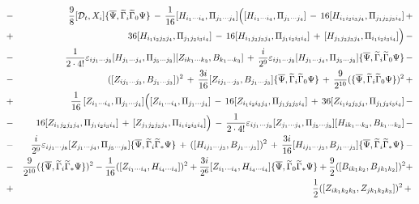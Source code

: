 \documentclass[a4paper,11pt]{article}
\begin{document}
\begin{eqnarray*}
&-&\frac{9}{8}[{\cal D}_{t},X_{i}]\{\overline{\Psi },\widetilde{\Gamma }_{i}\widetilde{\Gamma }_{0}\Psi\}\,-\,
\frac{1}{16}[H_{i_1 \cdots i_4},\Pi_{j_1 \cdots j_4}]\Big([H_{i_1 \cdots i_4},\Pi_{j_1 \cdots j_4}]\,-\,
16[H_{i_1 i_2 i_3 j_4},\Pi_{j_1 j_2 j_3 i_4}]\,+\nonumber \\
&+&\,36[H_{i_1 i_2 j_3 j_4},\Pi_{j_1 j_2 i_3 i_4}]\,-\,
16[H_{i_1 j_2 j_3 j_4},\Pi_{j_1 i_2 i_3 i_4}]\,+\,[H_{j_1 j_2 j_3 j_4},\Pi_{i_1 i_2 i_3 i_4}]\Big)\,-\nonumber\\
&-&\frac{1}{2\cdot 4!}\varepsilon_{ij_1 \cdots j_8}[H_{j_1 \cdots j_4},\Pi_{j_5 \cdots j_8}][Z_{i k_1 \cdots k_3},B_{k_1 \cdots k_3}]\,+\,
\frac{i}{2^9}\varepsilon_{ij_1 \cdots j_8}[H_{j_1 \cdots j_4},\Pi_{j_5 \cdots j_8}]\{\overline{\Psi },\widetilde{\Gamma }_{i}\widetilde{\Gamma }_{0}\Psi\}\,-\nonumber\\
&-&([Z_{i j_1 \cdots j_3},B_{j_1 \cdots j_3}])^2\,+\,
\frac{3i}{16}[Z_{i j_1 \cdots j_3},B_{j_1 \cdots j_3}]\{\overline{\Psi },\widetilde{\Gamma }_{i}\widetilde{\Gamma }_{0}\Psi\}\,+\,\frac{9}{2^{10}}(\{\overline{\Psi },\widetilde{\Gamma }_{i}\widetilde{\Gamma }_{0}\Psi\})^2\,+\nonumber\\
&+&\frac{1}{16}\,[Z_{i_1 \cdots i_4},\Pi_{j_1 \cdots j_4}]\Big([Z_{i_1 \cdots i_4},\Pi_{j_1 \cdots j_4}]\,-\,
16[Z_{i_1 i_2 i_3 j_4},\Pi_{j_1 j_2 j_3 i_4}]\,+\,36[Z_{i_1 i_2 j_3 j_4},\Pi_{j_1 j_2 i_3 i_4}]\,-\nonumber\\
&-&\,16[Z_{i_1 j_2 j_3 j_4},\Pi_{j_1 i_2 i_3 i_4}]\,+\,[Z_{j_1 j_2 j_3 j_4},\Pi_{i_1 i_2 i_3 i_4}]\Big)\,-\,
\frac{1}{2\cdot 4!}\varepsilon_{ij_1 \cdots j_8}[Z_{j_1 \cdots j_4},\Pi_{j_5 \cdots j_8}][H_{i k_1 \cdots k_3},B_{k_1 \cdots k_3}]\,-\nonumber\\
&-&\frac{i}{2^9}\varepsilon_{ij_1 \cdots j_8}[Z_{j_1 \cdots j_4},\Pi_{j_5 \cdots j_8}]\{\overline{\Psi },\widetilde{\Gamma }_{i}\widetilde{\Gamma }_{*}\Psi\}\,+\,([H_{i j_1 \cdots j_3},B_{j_1 \cdots j_3}])^2\,+\,
\frac{3i}{16}[H_{i j_1 \cdots j_3},B_{j_1 \cdots j_3}]\{\overline{\Psi },\widetilde{\Gamma }_{i}\widetilde{\Gamma }_{*}\Psi\}\,-\nonumber\\
&-&\frac{9}{2^{10}}(\{\overline{\Psi },\widetilde{\Gamma }_{i}\widetilde{\Gamma }_{*}\Psi\})^2-
\frac{1}{16}([Z_{i_1 \cdots i_4},H_{i_4 \cdots i_4}])^2+
\frac{3i}{2^6}[Z_{i_1 \cdots i_4},H_{i_4 \cdots i_4}]\{\overline{\Psi },\widetilde{\Gamma }_{0}\widetilde{\Gamma }_{*}\Psi\}+\frac{9}{2}([B_{i k_1 k_2},B_{j k_1 k_2}])^2+\nonumber\\
&+&\frac{1}{2}([Z_{i k_1 k_2 k_3},Z_{j k_1 k_2 k_3}])^2\,+\,                            

\end{eqnarray*}
\end{document}
